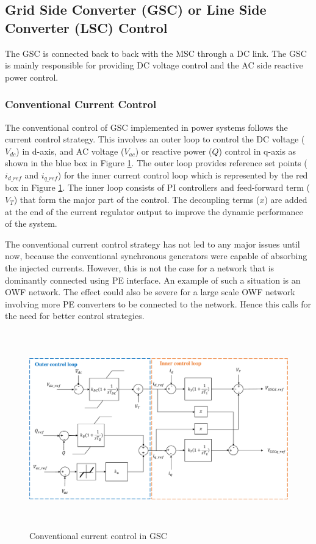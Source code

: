 \subsection{Grid Side Converter (GSC) or Line Side Converter (LSC) Control}
The \gls{GSC} is connected back to back with the \gls{MSC} through a \gls{DC} link. The \gls{GSC} is mainly responsible for providing \gls{DC} voltage control and the \gls{AC} side reactive power control. 

\subsubsection{Conventional Current Control}\label{conv_current_control}
The conventional control of \gls{GSC} implemented in power systems follows the current control strategy. This involves an outer loop to control the \gls{DC} voltage ($V_{dc}$) in d-axis, and \gls{AC} voltage ($V_{ac}$) or reactive power ($Q$) control in q-axis as shown in the blue box in Figure \ref{fig:Diss_GSC_control}. The outer loop provides reference set points ($i_{d\_ref}$ and $i_{q\_ref}$) for the inner current control loop which is represented by the red box in Figure \ref{fig:Diss_GSC_control}. The inner loop consists of \gls{PI} controllers and feed-forward term ($V_T$) that form the major part of the control. The decoupling terms ($x$) are added at the end of the current regulator output to improve the dynamic performance of the system.  

The conventional current control strategy has not led to any major issues until now, because the conventional synchronous generators were capable of absorbing the injected currents. However, this is not the case for a network that is dominantly connected using \gls{PE} interface. An example of such a situation is an \gls{OWF} network. The effect could also be severe for a large scale \gls{OWF} network involving more \gls{PE} converters to be connected to the network. Hence this calls for the need for better control strategies.

\begin{figure}[H]
\centering
    \includegraphics[height = 8.5cm,width = 15.5cm]{Diagrams/Chapter_2/Inner_control_GSC_chap2.pdf}
    \caption{Conventional current control in GSC \cite{korai_dynamic_2019}}
    \label{fig:Diss_GSC_control}
\end{figure}


